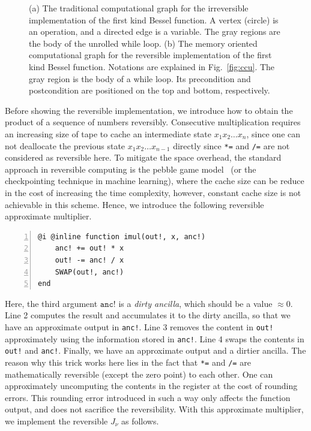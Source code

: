 \documentclass{article}
\newcommand{\<}{\langle}
\renewcommand{\>}{\rangle}
\newcommand{\Fig}[1]{Fig.~\ref{#1}}
\theoremstyle{definition}\newtheorem{definition}{\textit{Definition}}
\begin{document}
\begin{figure}[t!]
\begin{subfigure}[t]{0.47\textwidth}
        \caption{}
    \end{subfigure}
    \caption{(a) The traditional computational graph for the irreversible implementation of the first kind Bessel function. A vertex (circle) is an operation, and a directed edge is a variable. The gray regions are the body of the unrolled while loop.
        (b) The memory oriented computational graph for the reversible implementation of the first kind Bessel function. Notations are explained in \Fig{fig:ccu}.
    The gray region is the body of a while loop. Its precondition and postcondition are positioned on the top and bottom, respectively.
    }\label{fig:cgraphs}
\end{figure}

Before showing the reversible implementation, we introduce how to obtain the product of a sequence of numbers reversibly.
Consecutive multiplication requires an increasing size of tape to cache an intermediate state $x_1 x_2 \ldots x_n$, since one can not deallocate the previous state $x_1 x_2 \ldots x_{n-1}$ directly since \texttt{*=} and \texttt{/=} are not considered as reversible here.
To mitigate the space overhead, the standard approach in reversible computing is the pebble game model~\cite{Perumalla2013} (or the checkpointing technique in machine learning),
where the cache size can be reduce in the cost of increasing the time complexity, however, constant cache size is not achievable in this scheme.
Hence, we introduce the following reversible approximate multiplier.

\begin{minipage}{.88\columnwidth}
    \begin{lstlisting}[numberstyle=\scriptsize\color{gray},numbers=left,numbersep=8pt]
@i @inline function imul(out!, x, anc!)
    anc! += out! * x
    out! -= anc! / x
    SWAP(out!, anc!)
end
\end{lstlisting}
\end{minipage}

Here, the third argument $\texttt{anc!}$ is a \textit{dirty ancilla}, which should be a value $\approx 0$.
Line 2 computes the result and accumulates it to the dirty ancilla, so that we have an approximate output in \texttt{anc!}.
Line 3 removes the content in \texttt{out!} approximately using the information stored in \texttt{anc!}.
Line 4 swaps the contents in \texttt{out!} and \texttt{anc!}.
Finally, we have an approximate output and a dirtier ancilla.
The reason why this trick works here lies in the fact that \texttt{*=} and \texttt{/=} are mathematically reversible (except the zero point) to each other.
One can approximately uncomputing the contents in the register at the cost of rounding errors.
This rounding error introduced in such a way only affects the function output, and does not sacrifice the reversibility.
With this approximate multiplier, we implement the reversible $J_\nu$ as follows.
\end{document}
